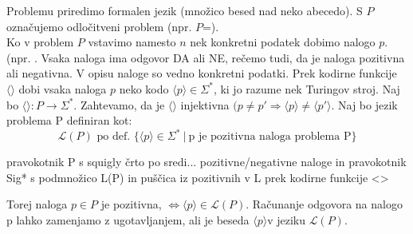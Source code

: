 \documentclass[10pt,a4paper,oneside]{book}
\begin{document}
Problemu priredimo formalen jezik (množico besed nad neko abecedo).
\br
S $P$ označujemo odločitveni problem (npr. $P$=).\\
Ko v problem $P$ vstavimo namesto $n$ nek konkretni podatek dobimo nalogo $p$. (npr. . Vsaka naloga ima odgovor DA ali NE, rečemo tudi, da je naloga pozitivna ali negativna.
V opisu naloge so vedno konkretni podatki.
Prek kodirne funkcije $\langle\rangle$ dobi vsaka naloga $p$ neko kodo $\langle p\rangle\in\Sigma^*$, ki jo razume nek Turingov stroj.
Naj bo $\langle \rangle :P\rightarrow \Sigma^*$. Zahtevamo, da je $\langle\rangle$ injektivna $(p \neq p' \Rightarrow \langle p \rangle \neq \langle p' \rangle$.%
Naj bo jezik problema P definiran kot:
\[ \mathcal{L}(P) \mbox{ po def. } \{ \langle p \rangle \in \Sigma^*\ |\ \mbox{p je pozitivna naloga problema P} \} \]

\fixme pravokotnik P s squigly črto po sredi... pozitivne/negativne naloge in pravokotnik Sig* s podmnožico L(P) in puščica iz pozitivnih v L prek kodirne funkcije <>

Torej naloga $p\in P$ je pozitivna, $\Leftrightarrow \langle p \rangle \in \mathcal{L}(P)$.
Računanje odgovora na nalogo p lahko zamenjamo z ugotavljanjem, ali je beseda $\langle p \rangle$v jeziku $\mathcal{L}(P)$.
\end{document}
